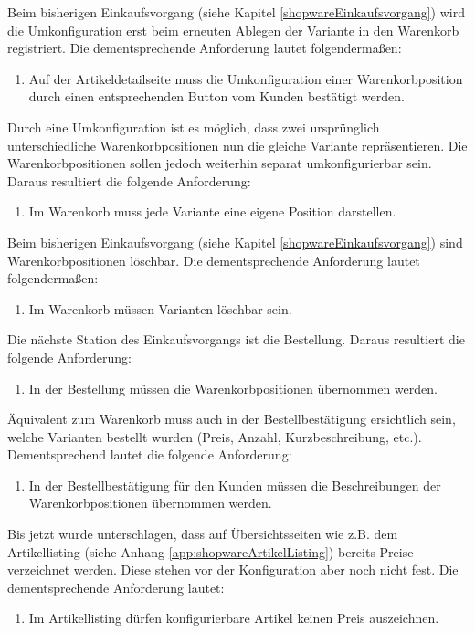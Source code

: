 \documentclass[11pt, a4paper, titlepage, listof=totoc, bibliography=totoc, index=totoc, twoside, openright, headings=normal]{scrreprt}
\begin{document}
Beim bisherigen Einkaufsvorgang (siehe Kapitel \ref{shopwareEinkaufsvorgang}) wird die Umkonfiguration erst beim erneuten Ablegen der Variante in den Warenkorb registriert. Die dementsprechende Anforderung lautet folgendermaßen:
\begin{enumerate}[SW.F11:]\bfseries
\item Auf der Artikeldetailseite muss die Umkonfiguration einer Warenkorbposition durch einen entsprechenden Button vom Kunden bestätigt werden.
\end{enumerate}
Durch eine Umkonfiguration ist es möglich, dass zwei ursprünglich unterschiedliche Warenkorbpositionen nun die gleiche Variante repräsentieren. Die Warenkorbpositionen sollen jedoch weiterhin separat umkonfigurierbar sein. Daraus resultiert die folgende Anforderung:
\begin{enumerate}[SW.F12:]\bfseries
\item Im Warenkorb muss jede Variante eine eigene Position darstellen.
\end{enumerate}
Beim bisherigen Einkaufsvorgang (siehe Kapitel \ref{shopwareEinkaufsvorgang}) sind Warenkorbpositionen löschbar. Die dementsprechende Anforderung lautet folgendermaßen:
\begin{enumerate}[SW.F13:]\bfseries
\item Im Warenkorb müssen Varianten löschbar sein.
\end{enumerate}
Die nächste Station des Einkaufsvorgangs ist die Bestellung. Daraus resultiert die folgende Anforderung:
\begin{enumerate}[SW.F14:]\bfseries
\item In der Bestellung müssen die Warenkorbpositionen übernommen werden.
\end{enumerate}
Äquivalent zum Warenkorb muss auch in der Bestellbestätigung ersichtlich sein, welche Varianten bestellt wurden (Preis, Anzahl, Kurzbeschreibung, etc.). Dementsprechend lautet die folgende Anforderung:
\begin{enumerate}[SW.F15:]\bfseries
\item In der Bestellbestätigung für den Kunden müssen die Beschreibungen der Warenkorbpositionen übernommen werden.
\end{enumerate}
Bis jetzt wurde unterschlagen, dass auf Übersichtsseiten wie z.B. dem Artikellisting (siehe Anhang \ref{app:shopwareArtikelListing}) bereits Preise verzeichnet werden. Diese stehen vor der Konfiguration aber noch nicht fest. Die dementsprechende Anforderung lautet:
\begin{enumerate}[SW.F16:]\bfseries
\item Im Artikellisting dürfen konfigurierbare Artikel keinen Preis auszeichnen.
\end{enumerate}
\end{document}
